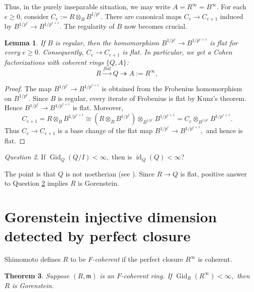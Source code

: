 \documentclass[11pt,a4paper]{amsart}
\numberwithin{equation}{section}
\newtheorem{theorem}{Theorem}[section]
\newtheorem{lemma}[theorem]{Lemma}
\theoremstyle{definition}
\theoremstyle{remark}
\newtheorem{question}[theorem]{Question}\newtheorem{discussion}[theorem]{Discussion}
\newcommand{\id}{\operatorname{id}}
\begin{document}
 

Thus, in the purely inseparable situation, we may write
$
A=R^\infty=B^\infty.
$
For each $e\geq0$, consider
$
C_e:=R\otimes_B B^{1/p^e}.
$
There are canonical maps
$
C_e\to C_{e+1}
$
induced by
$
B^{1/p^e}\to B^{1/p^{e+1}}.
$ The regularity of $B$ now becomes crucial.

\begin{lemma}\label{cf}
	If $B$ is regular, then the homomorphism
	\(
	B^{1/p^e}\to B^{1/p^{e+1}}
	\)
	is flat for every $e\geq0$. Consequently,
	\(
	C_e\to C_{e+1}
	\)
	is flat. In particular, we get a Cohen factorizations with coherent rings $\{Q,A\}$:
	\[
	R\stackrel{flat}\longrightarrow Q\twoheadrightarrow A:={R^{\infty}},
	\]
\end{lemma}

\begin{proof}
	The map
	\(
	B^{1/p^e}\to B^{1/p^{e+1}}
	\)
	is obtained from the Frobenius homomorphism on $B^{1/p^e}$.
	Since $B$ is regular, every iterate of Frobenius is flat by Kunz's
	theorem. Hence
	\(
	B^{1/p^e}\to B^{1/p^{e+1}}
	\)
	is flat.
	Moreover,
	\[
	C_{e+1}
	=
	R\otimes_BB^{1/p^{e+1}}
	\cong
	\left(R\otimes_BB^{1/p^e}\right)
	\otimes_{B^{1/p^e}}B^{1/p^{e+1}}
	=
	C_e\otimes_{B^{1/p^e}}B^{1/p^{e+1}}.
	\]
	Thus $C_e\to C_{e+1}$ is a base change of the flat map
	\(
	B^{1/p^e}\to B^{1/p^{e+1}},
	\)
	and hence is flat.
\end{proof}


\begin{question}\label{25}
	If
	\(
	\operatorname{Gid}_Q(Q/I)<\infty ,
	\)
	then is $\id_Q(Q)<\infty$?	\end{question}
The point is that $Q$ is not noetherian (see \cite[Theorem 3.22]{Totally}).	Since $R\to Q$ is flat, positive answer to {Question} \ref{25} implies $R$  is Gorenstein.
\maketitle


\section{Gorenstein injective dimension detected by perfect closure}


Shimomoto \cite{Shi10} defines \(R\) to be \emph{F-coherent} if the perfect closure \(R^\infty\) is coherent.

\begin{theorem}\label{3.1}
	Suppose \((R,\mathfrak m)\) is an \(F\)-coherent ring. If
	\(
	\operatorname{Gid}_R(R^\infty) < \infty,
	\)
	then \(R\) is Gorenstein.
\end{theorem}
\end{document}
